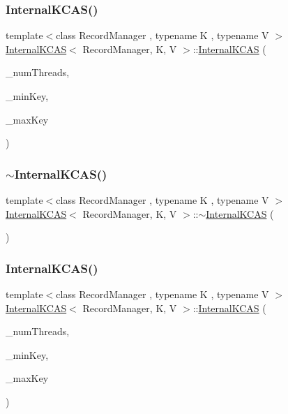\subsubsection{\texorpdfstring{Internal\+K\+C\+A\+S()}{InternalKCAS()}\hspace{0.1cm}{\footnotesize\ttfamily [1/2]}}
{\footnotesize\ttfamily template$<$class Record\+Manager , typename K , typename V $>$ \\
\hyperlink{classInternalKCAS}{Internal\+K\+C\+AS}$<$ Record\+Manager, K, V $>$\+::\hyperlink{classInternalKCAS}{Internal\+K\+C\+AS} (\begin{DoxyParamCaption}\item[{const int}]{\+\_\+num\+Threads,  }\item[{const int}]{\+\_\+min\+Key,  }\item[{const long long}]{\+\_\+max\+Key }\end{DoxyParamCaption})}

\mbox{\label{classInternalKCAS_abd61df2bf061536a6565252d31d3f3f3}} 
\subsubsection{\texorpdfstring{$\sim$\+Internal\+K\+C\+A\+S()}{~InternalKCAS()}\hspace{0.1cm}{\footnotesize\ttfamily [1/2]}}
{\footnotesize\ttfamily template$<$class Record\+Manager , typename K , typename V $>$ \\
\hyperlink{classInternalKCAS}{Internal\+K\+C\+AS}$<$ Record\+Manager, K, V $>$\+::$\sim$\hyperlink{classInternalKCAS}{Internal\+K\+C\+AS} (\begin{DoxyParamCaption}{ }\end{DoxyParamCaption})}

\mbox{\label{classInternalKCAS_ac9c322cd3a85b979a08de155c21f67e1}} 
\subsubsection{\texorpdfstring{Internal\+K\+C\+A\+S()}{InternalKCAS()}\hspace{0.1cm}{\footnotesize\ttfamily [2/2]}}
{\footnotesize\ttfamily template$<$class Record\+Manager , typename K , typename V $>$ \\
\hyperlink{classInternalKCAS}{Internal\+K\+C\+AS}$<$ Record\+Manager, K, V $>$\+::\hyperlink{classInternalKCAS}{Internal\+K\+C\+AS} (\begin{DoxyParamCaption}\item[{const int}]{\+\_\+num\+Threads,  }\item[{const int}]{\+\_\+min\+Key,  }\item[{const long long}]{\+\_\+max\+Key }\end{DoxyParamCaption})}

